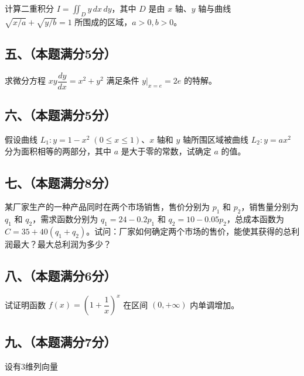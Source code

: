 \documentclass[UTF8,12pt]{ctexart}
\begin{document}
计算二重积分 \(\displaystyle I=\displaystyle \iint_D y\,dx\,dy\)，其中 \(\displaystyle D\) 是由 \(\displaystyle x\) 轴、\(\displaystyle y\) 轴与曲线 \(\displaystyle \sqrt{x/a}+\sqrt{y/b}=1\) 所围成的区域，\(\displaystyle a>0,\allowbreak b>0\)。


\subsection*{五、（本题满分5分）}

求微分方程 \(\displaystyle xy\dfrac{\displaystyle dy}{\displaystyle dx}=x^2+y^2\) 满足条件 \(\displaystyle y|_{x=e}=2e\) 的特解。


\subsection*{六、（本题满分5分）}

假设曲线 \(\displaystyle L_1:y=1-x^2\;(0\le x\le1)\)、\(\displaystyle x\) 轴和 \(\displaystyle y\) 轴所围区域被曲线 \(\displaystyle L_2:y=ax^2\) 分为面积相等的两部分，其中 \(\displaystyle a\) 是大于零的常数，试确定 \(\displaystyle a\) 的值。


\subsection*{七、（本题满分8分）}

某厂家生产的一种产品同时在两个市场销售，售价分别为 \(\displaystyle p_1\) 和 \(\displaystyle p_2\)，销售量分别为 \(\displaystyle q_1\) 和 \(\displaystyle q_2\)，需求函数分别为 \(\displaystyle q_1=24-0.2p_1\) 和 \(\displaystyle q_2=10-0.05p_2\)，总成本函数为 \(\displaystyle C=35+40(q_1+q_2)\)。试问：厂家如何确定两个市场的售价，能使其获得的总利润最大？最大总利润为多少？


\subsection*{八、（本题满分6分）}

试证明函数 \(\displaystyle f(x)=(1+\dfrac{\displaystyle 1}{\displaystyle x})^x\) 在区间 \(\displaystyle (0,\allowbreak +\infty)\) 内单调增加。


\subsection*{九、（本题满分7分）}

设有3维列向量
\end{document}
